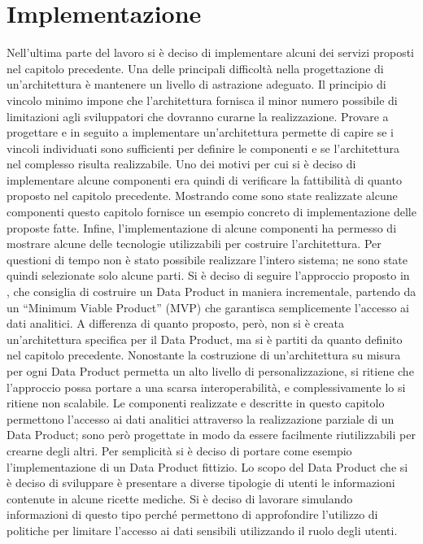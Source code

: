 \documentclass[a4paper,12pt]{report}
\begin{document}
\chapter{Implementazione}\label{implementazione}
Nell'ultima parte del lavoro si è deciso di implementare alcuni dei servizi proposti nel capitolo precedente.
Una delle principali difficoltà nella progettazione di un'architettura è mantenere un livello di astrazione adeguato.
Il principio di vincolo minimo impone che l'architettura fornisca il minor numero possibile di limitazioni agli sviluppatori che dovranno curarne la realizzazione.
Provare a progettare e in seguito a implementare un'architettura permette di capire se i vincoli individuati sono sufficienti per definire le componenti e se l'architettura nel complesso risulta realizzabile.
Uno dei motivi per cui si è deciso di implementare alcune componenti era quindi di verificare la fattibilità di quanto proposto nel capitolo precedente.
Mostrando come sono state realizzate alcune componenti questo capitolo fornisce un esempio concreto di implementazione delle proposte fatte.
Infine, l'implementazione di alcune componenti ha permesso di mostrare alcune delle tecnologie utilizzabili per costruire l'architettura. 
Per questioni di tempo non è stato possibile realizzare l'intero sistema; ne sono state quindi selezionate solo alcune parti.
Si è deciso di seguire l'approccio proposto in \cite{majchrzak2023data}, che consiglia di costruire un Data Product in maniera incrementale, partendo da un ``Minimum Viable Product'' (MVP) che garantisca semplicemente l'accesso ai dati analitici.
A differenza di quanto proposto, però, non si è creata un'architettura specifica per il Data Product, ma si è partiti da quanto definito nel capitolo precedente.
Nonostante la costruzione di un'architettura su misura per ogni Data Product permetta un alto livello di personalizzazione, si ritiene che l'approccio possa portare a una scarsa interoperabilità, e complessivamente lo si ritiene non scalabile.
Le componenti realizzate e descritte in questo capitolo permettono l'accesso ai dati analitici attraverso la realizzazione parziale di un Data Product; sono però progettate in modo da essere facilmente riutilizzabili per crearne degli altri. 
Per semplicità si è deciso di portare come esempio l'implementazione di un Data Product fittizio.
Lo scopo del Data Product che si è deciso di sviluppare è presentare a diverse tipologie di utenti le informazioni contenute in alcune ricette mediche.
Si è deciso di lavorare simulando informazioni di questo tipo perché permettono di approfondire l'utilizzo di politiche per limitare l'accesso ai dati sensibili utilizzando il ruolo degli utenti.
\end{document}
